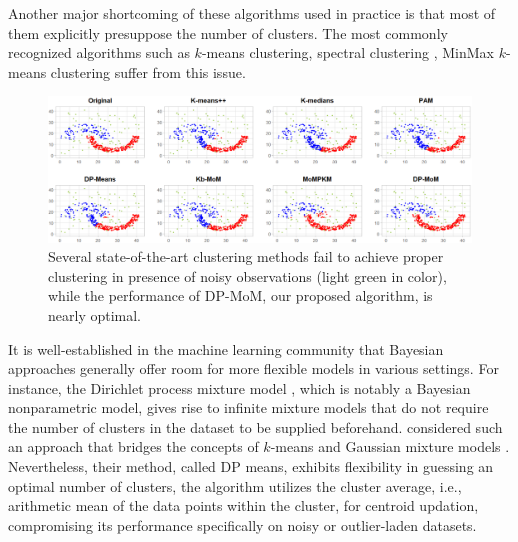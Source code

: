 \documentclass{article}
\begin{document}

Another major shortcoming of these algorithms used in practice is that most of them explicitly presuppose the number of clusters. The most commonly recognized algorithms such as $k$-means clustering, spectral clustering \cite{spectral-andrew-ng}, MinMax $k$-means clustering \cite{minmax-km} suffer from this issue. 

\begin{figure}[t]
    \centering
    \includegraphics[width = \textwidth]{Diagrams/plot-jain-sim-comparison-0.7.png}
    \caption{Several state-of-the-art clustering methods fail to achieve proper clustering in presence of noisy observations (light green in color), while the performance of DP-MoM, our proposed algorithm, is nearly optimal.}
    \label{fig:jain-out}
\end{figure}

It is well-established in the machine learning community that Bayesian approaches generally offer room for more flexible models in various settings. For instance, the Dirichlet process mixture model \cite{hjort_holmes_müller_walker_2010}, which is notably a Bayesian nonparametric model, gives rise to infinite mixture models that do not require the number of clusters in the dataset to be supplied beforehand. \cite{DP-Means} considered such an approach that bridges the concepts of $k$-means and Gaussian mixture models \cite{bishop2006pattern,murphy2018machine}. Nevertheless, their method, called DP means, exhibits flexibility in guessing an optimal number of clusters, the algorithm utilizes the cluster average, i.e., arithmetic mean of the data points within the cluster, for centroid updation, compromising its performance specifically on noisy or outlier-laden datasets.

\end{document}
